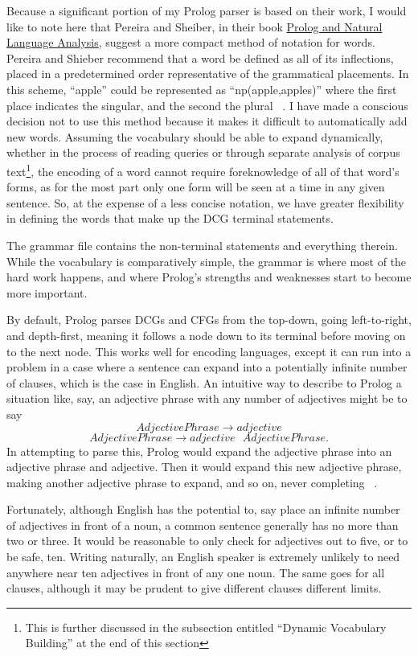 \documentclass[12pt]{article}
\begin{document}
Because a significant portion of my Prolog parser is based on their work, I would like to note here that Pereira and Sheiber, in their book \underline{Prolog and Natural Language Analysis}, suggest a more compact method of notation for words. Pereira and Shieber recommend that a word be defined as all of its inflections, placed in a predetermined order representative of the grammatical placements. In this scheme, ``apple'' could be represented as ``np(apple,apples)'' where the first place indicates the singular, and the second the plural ~\citep{PS}. I have made a conscious decision not to use this method because it makes it difficult to automatically add new words. Assuming the vocabulary should be able to expand dynamically, whether in the process of reading queries or through separate analysis of corpus text\footnote{This is further discussed in the subsection entitled ``Dynamic Vocabulary Building'' at the end of this section}, the encoding of a word cannot require foreknowledge of all of that word's forms, as for the most part only one form will be seen at a time in any given sentence. So, at the expense of a less concise notation, we have greater flexibility in defining the words that make up the DCG terminal statements.

The grammar file contains the non-terminal statements and everything therein. While the vocabulary is comparatively simple, the grammar is where most of the hard work happens, and where Prolog's strengths and weaknesses start to become more important.

By default, Prolog parses DCGs and CFGs from the top-down, going left-to-right, and depth-first, meaning it follows a node down to its terminal before moving on to the next node. This works well for encoding languages, except it can run into a problem in a case where a sentence can expand into a potentially infinite number of clauses, which is the case in English. An intuitive way to describe to Prolog a situation like, say, an adjective phrase with any number of adjectives might be to say \[AdjectivePhrase \rightarrow adjective\] \[AdjectivePhrase  \rightarrow adjective\mbox{ }AdjectivePhrase.\] In attempting to parse this, Prolog would expand the adjective phrase into an adjective phrase and adjective. Then it would expand this new adjective phrase, making another adjective phrase to expand, and so on, never completing ~\citep{leftrecursion}. 

Fortunately, although English has the potential to, say place an infinite number of adjectives in front of a noun, a common sentence generally has no more than two or three. It would be reasonable to only check for adjectives out to five, or to be safe, ten. Writing naturally, an English speaker is extremely unlikely to need anywhere near ten adjectives in front of any one noun. The same goes for all clauses, although it may be prudent to give different clauses different limits.
\end{document}
